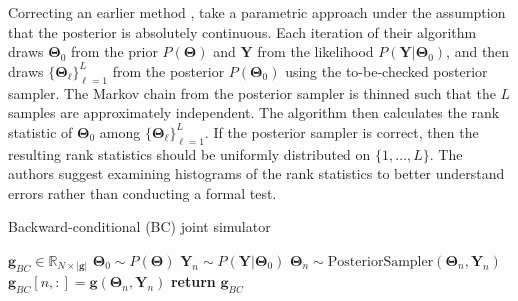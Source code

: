 \documentclass[a4paper,12pt]{article}
\begin{document}
Correcting an earlier method \cite{cook_validation_2006, gelman_correction_2017}, \cite{talts_validating_2018} take a parametric approach under the assumption that the posterior is absolutely continuous. Each iteration of their algorithm draws $\mathbf{\Theta}_{0}$ from the prior $P(\mathbf{\Theta})$ and $\mathbf{Y}$ from the likelihood $P(\mathbf{Y}|\mathbf{\Theta}_{0})$, and then draws $\{\mathbf{\Theta}_{\ell}\}_{\ell=1}^{L}$ from the posterior $P(\mathbf{\Theta}_{0})$ using the to-be-checked posterior sampler. The Markov chain from the posterior sampler is thinned such that the $L$ samples are approximately independent. The algorithm then calculates the rank statistic of $\mathbf{\Theta}_{0}$ among $\{\mathbf{\Theta}_{\ell}\}_{\ell=1}^{L}$. If the posterior sampler is correct, then the resulting rank statistics should be uniformly distributed on $\{1, \ldots, L\}$. The authors suggest examining histograms of the rank statistics to better understand errors rather than conducting a formal test.

\begin{algorithm}
    \centering
    \caption{Backward-conditional (BC) joint simulator}\label{alg:bc-sampler}
    \begin{algorithmic}[1]
        \State {} $\mathbf{g}_{BC} \in \mathbb{R}_{N\times |\mathbf{g}|}$
            \State $\mathbf{\Theta}_{0} \sim P(\mathbf{\Theta})$ 
            \State $\mathbf{Y}_{n} \sim P(\mathbf{Y}|\mathbf{\Theta}_{0})$ 
                \State $\mathbf{\Theta}_{n} \sim \text{PosteriorSampler}(\mathbf{\Theta}_{n}, \mathbf{Y}_{n})$
            \EndFor
            \State $\mathbf{g}_{BC}[n, :] = \mathbf{g}(\mathbf{\Theta}_{n}, \mathbf{Y}_{n})$ 
        \EndFor        
        \State \textbf{return} $\mathbf{g}_{BC}$
    \end{algorithmic}
\end{algorithm}
\end{document}
